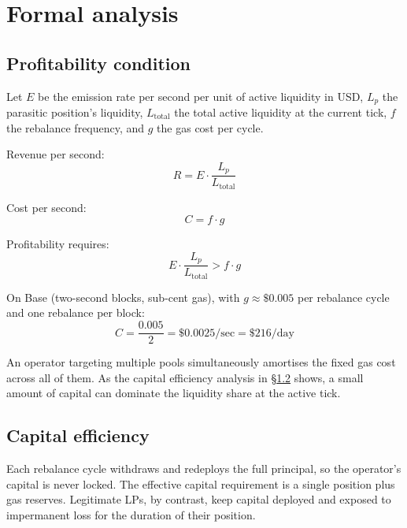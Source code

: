 \documentclass[11pt,a4paper]{article}
\theoremstyle{definition}
\begin{document}
\section{Formal analysis}\label{sec:analysis}

\subsection{Profitability condition}\label{sec:profit}

Let $E$ be the emission rate per second per unit of active liquidity in USD, $L_p$ the parasitic position's liquidity, $L_{\text{total}}$ the total active liquidity at the current tick, $f$ the rebalance frequency, and $g$ the gas cost per cycle.

Revenue per second:
\begin{equation}
R = E \cdot \frac{L_p}{L_{\text{total}}}
\end{equation}

Cost per second:
\begin{equation}
C = f \cdot g
\end{equation}

Profitability requires:
\begin{equation}
E \cdot \frac{L_p}{L_{\text{total}}} > f \cdot g
\end{equation}

On Base (two-second blocks, sub-cent gas), with $g \approx \$0.005$ per rebalance cycle and one rebalance per block:
\begin{equation}
C = \frac{0.005}{2} = \$0.0025/\text{sec} = \$216/\text{day}
\end{equation}

An operator targeting multiple pools simultaneously amortises the fixed gas cost across all of them. As the capital efficiency analysis in \S\ref{sec:capeff} shows, a small amount of capital can dominate the liquidity share at the active tick.

\subsection{Capital efficiency}\label{sec:capeff}

Each rebalance cycle withdraws and redeploys the full principal, so the operator's capital is never locked. The effective capital requirement is a single position plus gas reserves. Legitimate LPs, by contrast, keep capital deployed and exposed to impermanent loss for the duration of their position.
\end{document}

